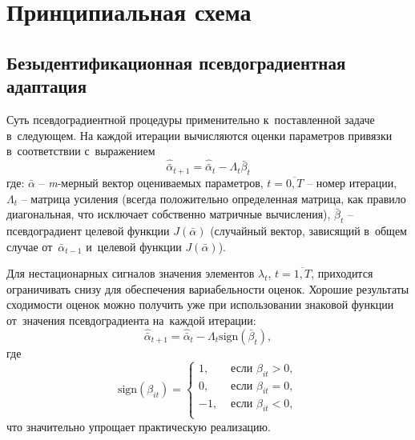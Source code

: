 \chapter{Принципиальная схема}
\section{Безыдентификационная псевдоградиентная адаптация}
Суть псевдоградиентной процедуры применительно к~поставленной задаче в~следующем. На каждой итерации вычисляются оценки параметров привязки в~соответствии с~выражением
\[
\hat{\bar{\alpha}}_{t+1}=\hat{\bar{\alpha}}_{t}-\Lambda_{t}\bar{\beta}_{t}
\]
где: $\bar{\alpha}$ -- \textit{m}-мерный вектор оцениваемых параметров, $t=\overline{0,T}$ -- номер итерации, $\Lambda_{t}$ -- матрица усиления (всегда положительно определенная матрица, как правило диагональная, что исключает собственно матричные вычисления), $\bar{\beta}_{t}$ -- псевдоградиент целевой функции $J(\bar{\alpha})$ (случайный вектор, зависящий в~общем случае от~$\bar{\alpha}_{t-1}$ и~целевой функции $J(\bar{\alpha})$).

Для нестационарных сигналов значения элементов $\lambda_{t}$, $t=\overline{1,T}$, приходится ограничивать снизу для обеспечения вариабельности оценок. Хорошие результаты сходимости оценок можно получить уже при использовании знаковой функции от~значения псевдоградиента на~каждой итерации:
\[
\hat{\bar{\alpha}}_{t+1}=\hat{\bar{\alpha}}_{t}-\Lambda_{t}\text{sign}(\bar{\beta}_{t}),
\]
где
\[
\text{sign}(\beta_{it})= 
\left\{
	\begin{aligned}
		1, &\text{ если } \beta_{it} > 0, \\
		0, &\text{ если } \beta_{it} = 0, \\
		-1, &\text{ если } \beta_{it} < 0, \\
	\end{aligned}
\right.
\]
что значительно упрощает практическую реализацию. 